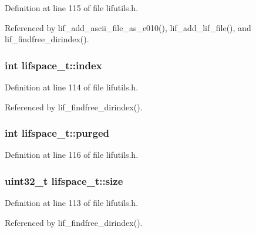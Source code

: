 Definition at line 115 of file lifutils.\+h.



Referenced by lif\+\_\+add\+\_\+ascii\+\_\+file\+\_\+as\+\_\+e010(), lif\+\_\+add\+\_\+lif\+\_\+file(), and lif\+\_\+findfree\+\_\+dirindex().

\subsubsection[{\texorpdfstring{index}{index}}]{\setlength{\rightskip}{0pt plus 5cm}int lifspace\+\_\+t\+::index}\hypertarget{structlifspace__t_abcca3daca009eca56173dc8577d597da}{}\label{structlifspace__t_abcca3daca009eca56173dc8577d597da}


Definition at line 114 of file lifutils.\+h.



Referenced by lif\+\_\+findfree\+\_\+dirindex().

\subsubsection[{\texorpdfstring{purged}{purged}}]{\setlength{\rightskip}{0pt plus 5cm}int lifspace\+\_\+t\+::purged}\hypertarget{structlifspace__t_a53fce276ffb7bb4f8556cc2e7ac76390}{}\label{structlifspace__t_a53fce276ffb7bb4f8556cc2e7ac76390}


Definition at line 116 of file lifutils.\+h.

\subsubsection[{\texorpdfstring{size}{size}}]{\setlength{\rightskip}{0pt plus 5cm}uint32\+\_\+t lifspace\+\_\+t\+::size}\hypertarget{structlifspace__t_a0519f0089ed8694cbb2208364c6b31bd}{}\label{structlifspace__t_a0519f0089ed8694cbb2208364c6b31bd}


Definition at line 113 of file lifutils.\+h.



Referenced by lif\+\_\+findfree\+\_\+dirindex().

